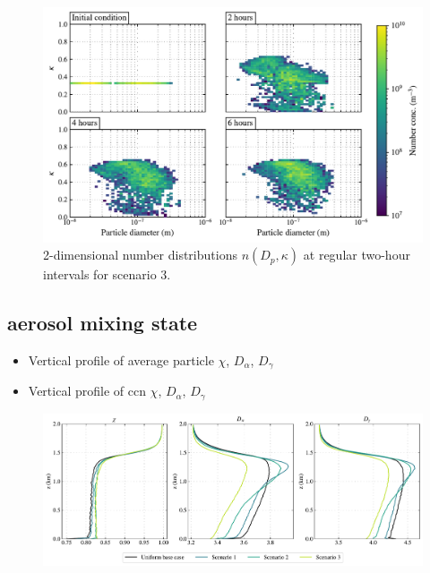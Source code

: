 \begin{figure}[!t]
  \centering
    \includegraphics[width=\textwidth]{figures/chapter5/2d-kappa-dist-4-panel-point-source-1x1-z40.pdf}
    \caption{2-dimensional number distributions $n(D_p, \kappa)$ at regular two-hour intervals for scenario 3.}
    \label{fig:2d-kappa-dist-s3}
\end{figure}


\subsection{aerosol mixing state}

\begin{itemize}
\item Vertical profile of average particle $\chi$, $D_{\alpha}$, $D_{\gamma}$
\item Vertical profile of ccn $\chi$, $D_{\alpha}$, $D_{\gamma}$
\end{itemize}

\begin{figure}[!t]
  \centering
    \includegraphics[width=\textwidth]{figures/chapter5/aerosol-mixingstate-vertical-profiles-time36.pdf}
    \caption{}
\end{figure}

